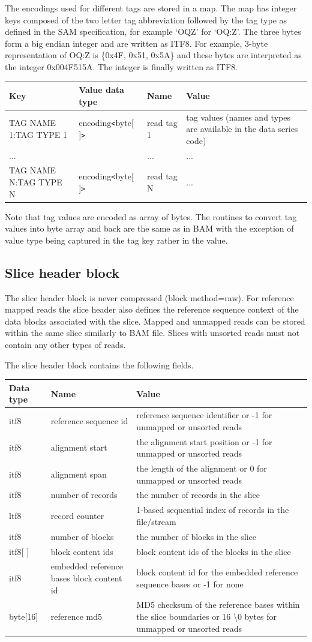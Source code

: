\documentclass[a4paper]{article}
\begin{document}
The encodings used for different tags are stored in a map. The map has integer 
keys composed of the two letter tag abbreviation followed by the tag type as defined 
in the SAM specification, for example `OQZ' for `OQ:Z'. The three bytes form a 
big endian integer and are written as ITF8. For example, 3-byte representation 
of OQ:Z is \{0x4F, 0x51, 0x5A\} and these bytes are interpreted as the integer 0x004F515A.
The integer is finally written as ITF8.

\begin{tabular}{|l|l|l|>{\raggedright}p{160pt}|}
\hline
\textbf{Key} & \textbf{Value data type} & \textbf{Name} & \textbf{Value}
\tabularnewline
\hline
TAG NAME 1:TAG TYPE 1 & encoding\texttt{<}byte[ ]\texttt{>} & read tag 1 & tag values 
(names and types are available in the data series code)\tabularnewline
\hline
... &  & ... & ...\tabularnewline
\hline
TAG NAME N:TAG TYPE N & encoding\texttt{<}byte[ ]\texttt{>} & read tag N & ...\tabularnewline
\hline
\end{tabular}

Note that tag values are encoded as array of bytes. The routines to convert tag 
values into byte array and back are the same as in BAM with the exception of value 
type being captured in the tag key rather in the value. 

\subsection{\textbf{Slice header block}}

The slice header block is never compressed (block method=raw). For reference mapped 
reads the slice header also defines the reference sequence context of the data 
blocks associated with the slice. Mapped and unmapped reads can be stored within 
the same slice similarly to BAM file. Slices with unsorted reads must not contain 
any other types of reads.

The slice header block contains the following fields.

\begin{tabular}{|l|l|>{\raggedright}p{200pt}|}
\hline
\textbf{Data type} & \textbf{Name} & \textbf{Value}\tabularnewline
\hline
itf8 & reference sequence id & reference sequence identifier or -1 for unmapped 
or unsorted reads\tabularnewline
\hline
itf8 & alignment start & the alignment start position or -1 for unmapped or unsorted 
reads\tabularnewline
\hline
itf8 & alignment span & the length of the alignment or 0 for unmapped or unsorted 
reads\tabularnewline
\hline
itf8 & number of records & the number of records in the slice\tabularnewline
\hline
ltf8 & record counter & 1-based sequential index of records in the file/stream\tabularnewline
\hline
itf8 & number of blocks & the number of blocks in the slice\tabularnewline
\hline
itf8[ ] & block content ids & block content ids of the blocks in the slice\tabularnewline
\hline
itf8 & embedded reference bases block content id & block content id for the embedded 
reference sequence bases or -1 for none\tabularnewline
\hline
byte[16] & reference md5 & MD5 checksum of the reference bases within the slice 
boundaries or 16 \textbackslash{}0 bytes for unmapped or unsorted reads\tabularnewline
\hline
\end{tabular}
\end{document}
